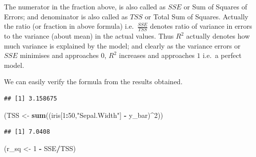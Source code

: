 \documentclass[
]{book}
\newenvironment{Shaded}{\begin{snugshade}}{\end{snugshade}}
\newcommand{\DecValTok}[1]{\textcolor[rgb]{0.00,0.00,0.81}{#1}}
\newcommand{\DocumentationTok}[1]{\textcolor[rgb]{0.56,0.35,0.01}{\textbf{\textit{#1}}}}
\newcommand{\FunctionTok}[1]{\textcolor[rgb]{0.13,0.29,0.53}{\textbf{#1}}}
\newcommand{\NormalTok}[1]{#1}
\newcommand{\OtherTok}[1]{\textcolor[rgb]{0.56,0.35,0.01}{#1}}
\newcommand{\SpecialCharTok}[1]{\textcolor[rgb]{0.81,0.36,0.00}{\textbf{#1}}}
\newcommand{\StringTok}[1]{\textcolor[rgb]{0.31,0.60,0.02}{#1}}
\begin{document}
The numerator in the fraction above, is also called as \(SSE\) or Sum of Squares of Errors; and denominator is also called as \(TSS\) or Total Sum of Squares. Actually the ratio (or fraction in above formula) i.e.~\(\frac{SSE}{TSS}\) denotes ratio of variance in errors to the variance (about mean) in the actual values. Thus \(R^2\) actually denotes how much variance is explained by the model; and clearly as the variance errors or \(SSE\) minimises and approaches \(0\), \(R^2\) increases and approaches \(1\) i.e.~a perfect model.

We can easily verify the formula from the results obtained.

\begin{Shaded}
\end{Shaded}

\begin{verbatim}
## [1] 3.158675
\end{verbatim}

\begin{Shaded}
\begin{Highlighting}[]
\NormalTok{(TSS }\OtherTok{\textless{}{-}} \FunctionTok{sum}\NormalTok{((iris[}\DecValTok{1}\SpecialCharTok{:}\DecValTok{50}\NormalTok{,}\StringTok{"Sepal.Width"}\NormalTok{] }\SpecialCharTok{{-}}\NormalTok{ y\_bar)}\SpecialCharTok{\^{}}\DecValTok{2}\NormalTok{))}
\end{Highlighting}
\end{Shaded}

\begin{verbatim}
## [1] 7.0408
\end{verbatim}

\begin{Shaded}
\begin{Highlighting}[]
\NormalTok{(r\_sq }\OtherTok{\textless{}{-}} \DecValTok{1} \SpecialCharTok{{-}}\NormalTok{ SSE}\SpecialCharTok{/}\NormalTok{TSS)}
\end{Highlighting}
\end{Shaded}
\end{document}
